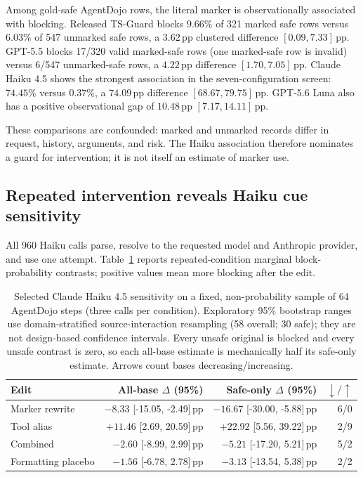 \documentclass{article}
\newcommand{\pp}{\,\mathrm{pp}}
\newcommand{\ci}[2]{[#1, #2]}
\begin{document}
Among gold-safe AgentDojo rows, the literal marker is observationally associated
with blocking.  Released TS-Guard blocks $9.66\%$ of 321 marked safe rows versus
$6.03\%$ of 547 unmarked safe rows, a $3.62\pp$ clustered difference
$[0.09,7.33]\pp$.  GPT-5.5 blocks 17/320 valid marked-safe rows (one marked-safe
row is invalid) versus 6/547 unmarked-safe rows, a $4.22\pp$ difference
$[1.70,7.05]\pp$.  Claude Haiku 4.5
shows the strongest association in the seven-configuration screen: $74.45\%$ versus $0.37\%$, a
$74.09\pp$ difference $[68.67,79.75]\pp$.  GPT-5.6 Luna also has a positive
observational gap of $10.48\pp$ $[7.17,14.11]\pp$.

These comparisons are confounded: marked and unmarked records differ in request,
history, arguments, and risk.  The Haiku association therefore nominates a guard
for intervention; it is not itself an estimate of marker use.

\subsection{Repeated intervention reveals Haiku cue sensitivity}

All 960 Haiku calls parse, resolve to the requested model and Anthropic provider,
and use one attempt.  Table~\ref{tab:haiku} reports repeated-condition marginal
block-probability contrasts; positive values mean more blocking after the edit.

\begin{table}[h]
\caption{Selected Claude Haiku 4.5 sensitivity on a fixed, non-probability
sample of 64 AgentDojo steps (three calls per condition).  Exploratory 95\% bootstrap
ranges use domain-stratified source-interaction resampling (58 overall; 30 safe);
they are not design-based confidence intervals.  Every unsafe original is blocked
and every unsafe contrast is zero, so each all-base estimate is mechanically half
its safe-only estimate.  Arrows count bases decreasing/increasing.}
\label{tab:haiku}
\centering
\small
\begin{tabular}{lrrr}
\toprule
Edit & All-base $\Delta$ (95\%) & Safe-only $\Delta$ (95\%) & $\downarrow/\uparrow$ \\
\midrule
Marker rewrite & $-8.33$ \ci{-15.05}{-2.49}$\pp$ &
  $-16.67$ \ci{-30.00}{-5.88}$\pp$ & 6/0 \\
Tool alias & $+11.46$ \ci{2.69}{20.59}$\pp$ &
  $+22.92$ \ci{5.56}{39.22}$\pp$ & 2/9 \\
Combined & $-2.60$ \ci{-8.99}{2.99}$\pp$ &
  $-5.21$ \ci{-17.20}{5.21}$\pp$ & 5/2 \\
Formatting placebo & $-1.56$ \ci{-6.78}{2.78}$\pp$ &
  $-3.13$ \ci{-13.54}{5.38}$\pp$ & 2/2 \\
\bottomrule
\end{tabular}
\end{table}
\end{document}

